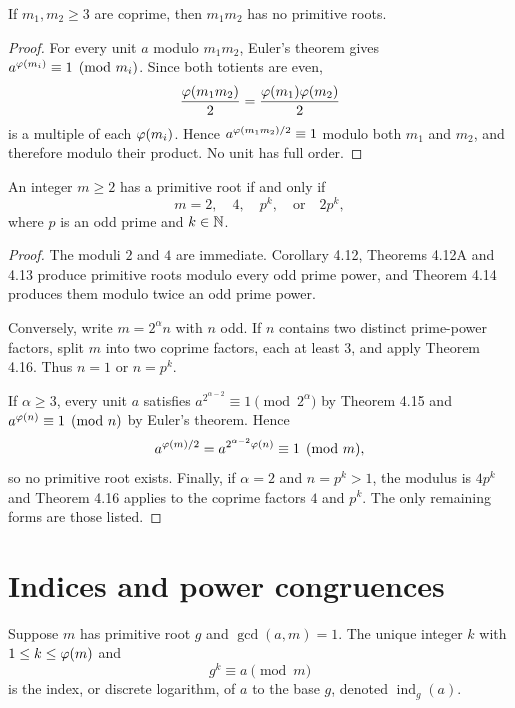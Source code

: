 \begin{thm}
If $m_1,m_2\ge3$ are coprime, then $m_1m_2$ has no primitive roots.
\end{thm}
\begin{proof}
For every unit $a$ modulo $m_1m_2$, Euler's theorem gives
$a^{\varphi(m_i)}\equiv1\pmod{m_i}$.  Since both totients are even,
\[
 \frac{\varphi(m_1m_2)}2
 =\frac{\varphi(m_1)\varphi(m_2)}2
\]
is a multiple of each $\varphi(m_i)$.  Hence
$a^{\varphi(m_1m_2)/2}\equiv1$ modulo both $m_1$ and $m_2$, and therefore modulo their product.  No unit has full order.
\end{proof}

\begin{thm}
An integer $m\ge2$ has a primitive root if and only if
\[
 m=2,\quad 4,\quad p^k,\quad\text{or}\quad2p^k,
\]
where $p$ is an odd prime and $k\in\mathbb{N}$.
\end{thm}
\begin{proof}
The moduli $2$ and $4$ are immediate.  Corollary 4.12, Theorems 4.12A and 4.13 produce primitive roots modulo every odd prime power, and Theorem 4.14 produces them modulo twice an odd prime power.

Conversely, write $m=2^\alpha n$ with $n$ odd.  If $n$ contains two distinct prime-power factors, split $m$ into two coprime factors, each at least $3$, and apply Theorem 4.16.  Thus $n=1$ or $n=p^k$.

If $\alpha\ge3$, every unit $a$ satisfies
$a^{2^{\alpha-2}}\equiv1\pmod{2^\alpha}$ by Theorem 4.15 and
$a^{\varphi(n)}\equiv1\pmod n$ by Euler's theorem.  Hence
\[
 a^{\varphi(m)/2}=a^{2^{\alpha-2}\varphi(n)}\equiv1\pmod m,
\]
so no primitive root exists.  Finally, if $\alpha=2$ and $n=p^k>1$, the modulus is $4p^k$ and Theorem 4.16 applies to the coprime factors $4$ and $p^k$.  The only remaining forms are those listed.
\end{proof}

\section{Indices and power congruences}

\begin{de}
Suppose $m$ has primitive root $g$ and $\gcd(a,m)=1$.  The unique integer $k$ with
$1\le k\le\varphi(m)$ and
\[
 g^k\equiv a\pmod m
\]
is the index, or discrete logarithm, of $a$ to the base $g$, denoted $\operatorname{ind}_g(a)$.
\end{de}

